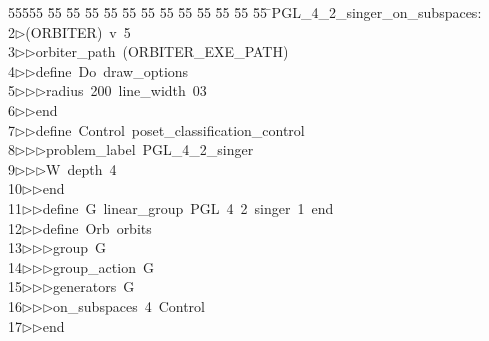 %
%
\begin{tabbing}
55555 \= 55 \= 55 \= 55 \= 55 \= 55 \= 55 \= 55 \= 55 \= 55 \= 55 \= 55 \= 55 \= \>PGL\_4\_2\_singer\_on\_subspaces:\\[0pt]
2\>$\triangleright$\>(ORBITER)\ v\ 5\ \\[0pt]
3\>$\triangleright$\>$\triangleright$\>orbiter\_path\ (ORBITER\_EXE\_PATH)\ \\[0pt]
4\>$\triangleright$\>$\triangleright$\>define\ Do\ draw\_options\ \\[0pt]
5\>$\triangleright$\>$\triangleright$\>$\triangleright$\>radius\ 200\ line\_width\ 03\ \\[0pt]
6\>$\triangleright$\>$\triangleright$\>end\ \\[0pt]
7\>$\triangleright$\>$\triangleright$\>define\ Control\ poset\_classification\_control\ \\[0pt]
8\>$\triangleright$\>$\triangleright$\>$\triangleright$\>problem\_label\ PGL\_4\_2\_singer\ \\[0pt]
9\>$\triangleright$\>$\triangleright$\>$\triangleright$\>W\ depth\ 4\ \\[0pt]
10\>$\triangleright$\>$\triangleright$\>end\ \\[0pt]
11\>$\triangleright$\>$\triangleright$\>define\ G\ linear\_group\ PGL\ 4\ 2\ singer\ 1\ end\ \\[0pt]
12\>$\triangleright$\>$\triangleright$\>define\ Orb\ orbits\ \\[0pt]
13\>$\triangleright$\>$\triangleright$\>$\triangleright$\>group\ G\ \\[0pt]
14\>$\triangleright$\>$\triangleright$\>$\triangleright$\>group\_action\ G\ \\[0pt]
15\>$\triangleright$\>$\triangleright$\>$\triangleright$\>generators\ G\ \\[0pt]
16\>$\triangleright$\>$\triangleright$\>$\triangleright$\>on\_subspaces\ 4\ Control\ \\[0pt]
17\>$\triangleright$\>$\triangleright$\>end\ \\[0pt]

\end{tabbing}
